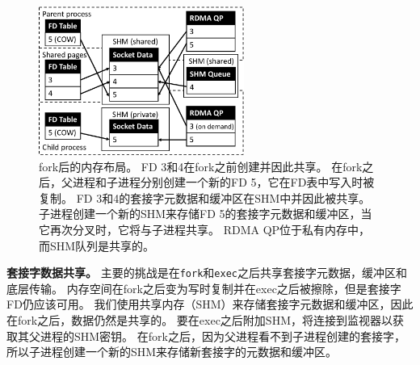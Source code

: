 \begin{figure}[htbp]
	\centering
	\includegraphics[width=0.6\textwidth]{images/fork_memory}
	
	\caption{fork后的内存布局。 FD 3和4在fork之前创建并因此共享。 在fork之后，父进程和子进程分别创建一个新的FD 5，它在FD表中写入时被复制。 FD 3和4的套接字元数据和缓冲区在SHM中并因此被共享。 子进程创建一个新的SHM来存储FD 5的套接字元数据和缓冲区，当它再次分叉时，它将与子进程共享。 RDMA QP位于私有内存中，而SHM队列是共享的。}
	\label{socksdirect:fig:fork-memory}
\end{figure}
\textbf {套接字数据共享。}
主要的挑战是在\texttt {fork}和\texttt {exec}之后共享套接字元数据，缓冲区和底层传输。
内存空间在fork之后变为写时复制并在exec之后被擦除，但是套接字FD仍应该可用。
我们使用共享内存（SHM）来存储套接字元数据和缓冲区，因此在fork之后，数据仍然是共享的。
要在exec之后附加SHM，\libipc {}将连接到监视器以获取其父进程的SHM密钥。
在fork之后，因为父进程看不到子进程创建的套接字，所以子进程创建一个新的SHM来存储新套接字的元数据和缓冲区。

